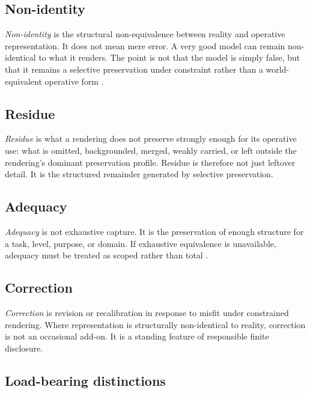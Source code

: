 \documentclass[11pt]{article}
\renewcommand{\emph}[1]{\textit{#1}}
\begin{document}
\subsection{Non-identity}

\emph{Non-identity} is the structural non-equivalence between reality and operative representation. It does not mean mere error. A very good model can remain non-identical to what it renders. The point is not that the model is simply false, but that it remains a selective preservation under constraint rather than a world-equivalent operative form \cite{FriggNguyen2021ScientificRepresentationSEP,ConantAshby1970GoodRegulator}.

\subsection{Residue}

\emph{Residue} is what a rendering does not preserve strongly enough for its operative use: what is omitted, backgrounded, merged, weakly carried, or left outside the rendering's dominant preservation profile. Residue is therefore not just leftover detail. It is the structured remainder generated by selective preservation.

\subsection{Adequacy}

\emph{Adequacy} is not exhaustive capture. It is the preservation of enough structure for a task, level, purpose, or domain. If exhaustive equivalence is unavailable, adequacy must be treated as scoped rather than total \cite{FriggHartmann2025ModelsScienceSEP,Giere2006ScientificPerspectivism,Massimi2022PerspectivalRealism}.

\subsection{Correction}

\emph{Correction} is revision or recalibration in response to misfit under constrained rendering. Where representation is structurally non-identical to reality, correction is not an occasional add-on. It is a standing feature of responsible finite disclosure.

\subsection{Load-bearing distinctions}
\end{document}

